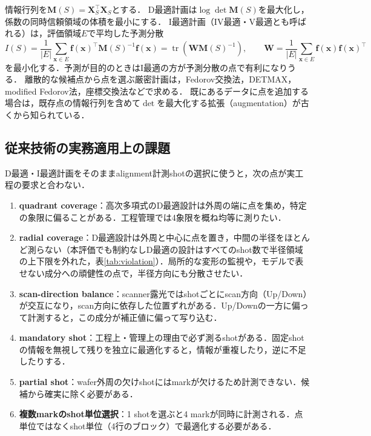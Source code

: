 \documentclass[10.5pt,a4paper]{ltjsarticle}
\DeclareMathOperator{\tr}{tr}
\begin{document}
情報行列を$\bm{M}(S)=\bm{X}_S^\top\bm{X}_S$とする．
D最適計画は$\log\det\bm{M}(S)$を最大化し，係数の同時信頼領域の体積を最小にする\cite{fedorov1972,atkinson2007}．
I最適計画（IV最適・V最適とも呼ばれる）は，評価領域$E$で平均した予測分散
\begin{equation}
  I(S)=\frac{1}{|E|}\sum_{\bm{x}\in E}\bm{f}(\bm{x})^\top\bm{M}(S)^{-1}\bm{f}(\bm{x})
       =\tr\!\left(\bm{W}\bm{M}(S)^{-1}\right),\qquad \bm{W}=\frac{1}{|E|}\sum_{\bm{x}\in E}\bm{f}(\bm{x})\bm{f}(\bm{x})^\top
  \label{eq:icrit}
\end{equation}
を最小化する\cite{atkinson2007,goos2011}．予測が目的のときはI最適の方が予測分散の点で有利になりうる\cite{jones2012}．
離散的な候補点から点を選ぶ厳密計画は，Fedorov交換法\cite{fedorov1972}，DETMAX\cite{mitchell1974}，modified Fedorov法\cite{cook1980}，座標交換法\cite{meyer1995}などで求める．
既にあるデータに点を追加する場合は，既存点の情報行列を含めて$\det$を最大化する拡張（augmentation）が古くから知られている\cite{dykstra1971}．

\subsection{従来技術の実務適用上の課題}
\label{sec:prior-issues}

D最適・I最適計画をそのままalignment計測shotの選択に使うと，次の点が実工程の要求と合わない．

\begin{enumerate}
  \item \textbf{quadrant coverage}：高次多項式のD最適設計は外周の端に点を集め，特定の象限に偏ることがある．工程管理では4象限を概ね均等に測りたい．
  \item \textbf{radial coverage}：D最適設計は外周と中心に点を置き，中間の半径をほとんど測らない（本評価でも制約なしD最適の設計はすべてのshot数で半径領域の上下限を外れた，表\ref{tab:violation}）．局所的な変形の監視や，モデルで表せない成分への頑健性の点で，半径方向にも分散させたい．
  \item \textbf{scan-direction balance}：scanner露光ではshotごとにscan方向（Up/Down）が交互になり，scan方向に依存した位置ずれがある．Up/Downの一方に偏って計測すると，この成分が補正値に偏って写り込む．
  \item \textbf{mandatory shot}：工程上・管理上の理由で必ず測るshotがある．固定shotの情報を無視して残りを独立に最適化すると，情報が重複したり，逆に不足したりする．
  \item \textbf{partial shot}：wafer外周の欠けshotにはmarkが欠けるため計測できない．候補から確実に除く必要がある．
  \item \textbf{複数markのshot単位選択}：1 shotを選ぶと4 markが同時に計測される．点単位ではなくshot単位（4行のブロック）で最適化する必要がある．
\end{enumerate}
\end{document}
